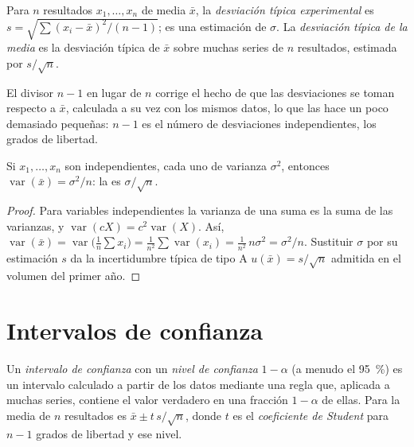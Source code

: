 \begin{definition}[Dispersión]\label{def:b2:measurement-statistics:dispersion}
Para $n$ resultados $x_1, \dots, x_n$ de media $\bar x$, la \emph{desviación típica
experimental} es $s = \sqrt{\sum (x_i - \bar x)^2/(n-1)}$; es una
estimación de $\sigma$. La \emph{desviación típica de la media} es
la desviación típica de $\bar x$ sobre muchas series de $n$ resultados, estimada por $s/\sqrt n$.
\end{definition}

El divisor $n - 1$ en lugar de $n$ corrige el hecho de que las desviaciones se toman respecto a $\bar x$,
calculada a su vez con los mismos datos, lo que las hace un poco demasiado pequeñas: $n - 1$ es el número de
desviaciones independientes, los grados de libertad.

\begin{theorem}\label{thm:b2:measurement-statistics:mean-variance}
Si $x_1, \dots, x_n$ son independientes, cada uno de varianza $\sigma^2$, entonces $\operatorname{var}(\bar x) =
\sigma^2/n$: la  es $\sigma/\sqrt n$.
\end{theorem}

\begin{proof}
Para variables independientes la varianza de una suma es la suma de las varianzas, y
$\operatorname{var}(cX) = c^2\operatorname{var}(X)$. Así, $\operatorname{var}(\bar x) =
\operatorname{var}\bigl(\tfrac1n\sum x_i\bigr) = \tfrac{1}{n^2}\sum\operatorname{var}(x_i) =
\tfrac{1}{n^2}\,n\sigma^2 = \sigma^2/n$. Sustituir $\sigma$ por su estimación $s$ da la incertidumbre
típica de tipo A $u(\bar x) = s/\sqrt n$ admitida en el volumen del primer año.
\end{proof}

\section{Intervalos de confianza}

\begin{definition}\label{def:b2:measurement-statistics:confidence}
Un \emph{intervalo de confianza} con un \emph{nivel de confianza}
$1 - \alpha$ (a menudo el 95~\%) es un intervalo calculado a partir de los datos mediante una regla que, aplicada a
muchas series, contiene el valor verdadero en una fracción $1 - \alpha$ de ellas. Para la media de $n$ resultados
es $\bar x \pm t\,s/\sqrt n$, donde $t$ es el \emph{coeficiente de Student}
para $n - 1$ grados de libertad y ese nivel.
\end{definition}

